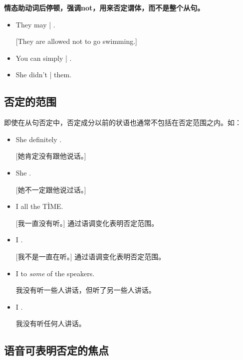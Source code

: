 \textbf{情态助动词后停顿，强调not，用来否定谓体，而不是整个从句。}

\begin{itemize}
\item They may | .

  [They are allowed not to go swimming.]

\item You can simply | .

\item She didn't |  them.
\end{itemize}

\subsection{否定的范围}

即使在从句否定中，否定成分以前的状语也通常不包括在否定范围之内。如：
\begin{itemize}
\item She definitely .

  [她肯定没有跟他说话。]
\item She .

  [她不一定跟他说过话。]

\item I  all the T\`IME.

  [我一直没有听。] 通过语调变化表明否定范围。

\item I .

  [我不是一直在听。] 通过语调变化表明否定范围。

\item I  to \emph{some} of the speakers.

  我没有听一些人讲话，但听了另一些人讲话。
\item I .

  我没有听任何人讲话。

\end{itemize}

\subsection{语音可表明否定的焦点}

